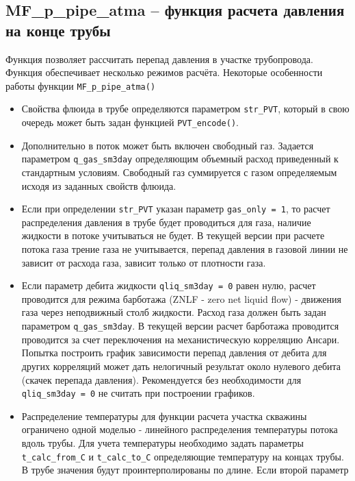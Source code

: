 \subsection{MF\_p\_pipe\_atma – функция расчета давления на конце трубы}  
Функция позволяет рассчитать перепад давления в участке трубопровода. Функция обеспечивает несколько режимов расчёта. Некоторые особенности работы функции \texttt{MF_p_pipe_atma()}
\begin{itemize}
	\item Свойства флюида в трубе определяются параметром \texttt{str_PVT}, который в свою очередь может быть задан функцией \texttt{PVT_encode()}.
	\item Дополнительно в поток может быть включен свободный газ. Задается параметром \texttt{q_gas_sm3day} определяющим объемный расход приведенный к стандартным условиям. Свободный газ суммируется с газом определяемым исходя из заданных свойств флюида. 
	\item Если при определении \texttt{str_PVT} указан параметр \texttt{gas_only = 1}, то расчет распределения давления в трубе будет проводиться для газа, наличие жидкости в потоке учитываться не будет. В текущей версии \unf{} при расчете потока газа трение газа не учитывается, перепад давления в газовой линии не зависит от расхода газа, зависит только от плотности газа.
	\item Если параметр дебита жидкости  \texttt{qliq_sm3day = 0}  равен нулю, расчет проводится для режима барботажа (ZNLF - zero net liquid flow) - движения газа через неподвижный столб жидкости. Расход газа должен быть задан параметром \texttt{q_gas_sm3day}. В текущей версии \unf{} расчет барботажа проводится проводится за счет переключения на механистическую корреляцию Ансари. Попытка построить график зависимости перепад давления от дебита для других корреляций может дать нелогичный результат около нулевого дебита (скачек перепада давления). Рекомендуется без необходимости для \texttt{qliq_sm3day = 0} не считать при построении графиков.
	\item Распределение температуры для функции расчета участка скважины ограничено одной моделью - линейного распределения температуры потока вдоль трубы. Для учета температуры необходимо задать параметры \texttt{t_calc_from_C} и \texttt{t_calc_to_C} определяющие температуру на концах трубы. В трубе значения будут проинтерполированы по длине. Если второй параметр 
\end{itemize}
 

